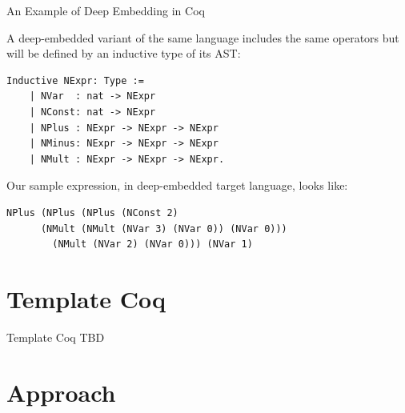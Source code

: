 \documentclass[aspectratio=169]{beamer}
\begin{document}
\begin{frame}[fragile]{An Example of Deep Embedding in Coq}

  A deep-embedded variant of the same language includes the same
  operators but will be defined by an inductive type of its AST:

  \begin{lstlisting}[language=Coq, mathescape=true,
    frame=single, basicstyle=\footnotesize]
    Inductive NExpr: Type :=
    | NVar  : nat -> NExpr 
    | NConst: nat -> NExpr
    | NPlus : NExpr -> NExpr -> NExpr
    | NMinus: NExpr -> NExpr -> NExpr
    | NMult : NExpr -> NExpr -> NExpr.
  \end{lstlisting}

  Our sample expression, in deep-embedded target language, looks like:
  
  \begin{lstlisting}[language=Coq, mathescape=true,
    basicstyle=\footnotesize, frame=single]
    NPlus (NPlus (NPlus (NConst 2)
      (NMult (NMult (NVar 3) (NVar 0)) (NVar 0)))
        (NMult (NVar 2) (NVar 0))) (NVar 1)
  \end{lstlisting}
  
\end{frame}

\section{Template Coq}

\begin{frame}{Template Coq}
  TBD
\end{frame}

\section{Approach}
\end{document}
